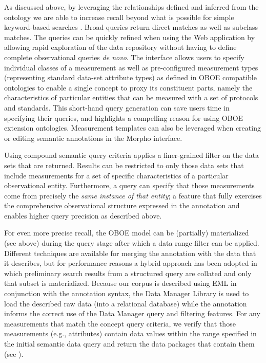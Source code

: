 As discussed above, by leveraging the relationships defined and
inferred from the ontology we are able to increase recall beyond what
is possible for simple keyword-based searches
\cite{berkley09:_improv_data_discov_for_metad}. Broad queries return
direct matches as well as subclass matches. The queries can be quickly
refined when using the Web application by allowing rapid exploration
of the data repository without having to define complete observational
queries \emph{de novo}. The interface allows users to specify
individual classes of a measurement as well as pre-configured
measurement types (representing standard data-set attribute types) as
defined in OBOE compatible ontologies to enable a single concept to
proxy its constituent parts, namely the characteristics of particular
entities that can be measured with a set of protocols and
standards. This short-hand query generation can save users time in
specifying their queries, and highlights a compelling reason for using
OBOE extension ontologies. Measurement templates can also be leveraged when creating or
editing semantic annotations in the Morpho interface.

Using compound semantic query criteria applies a finer-grained filter
on the data sets that are returned. Results can be restricted to only
those data sets that include measurements for a set of specific
characteristics of a particular observational entity. Furthermore, a
query can specify that those measurements come from precisely the
\emph{same instance of that entity}; a feature that fully exercises
the comprehensive observational structure expressed in the annotation
and enables higher query precision as described above.

 For even more precise recall, the OBOE
model can be (partially) materialized (see above) during the query
stage after which a data range filter can be applied. Different
techniques are available for merging the annotation with the data that
it describes, but for performance reasons a hybrid approach has been
adopted in which preliminary search results from a structured query
are collated and only that subset is materialized. Because our corpus
is described using EML in conjunction with the annotation syntax, the
Data Manager Library \cite{leinfelder10:_metad_driven_approac_to_loadin} is used to load the described
raw data (into a relational database) while the annotation informs the
correct use of the Data Manager query and filtering features. For any
measurements that match the concept query criteria, we verify that
those measurements (e.g., attributes) contain data values within the
range specified in the initial semantic data query and return the data
packages that contain them (see ). 

